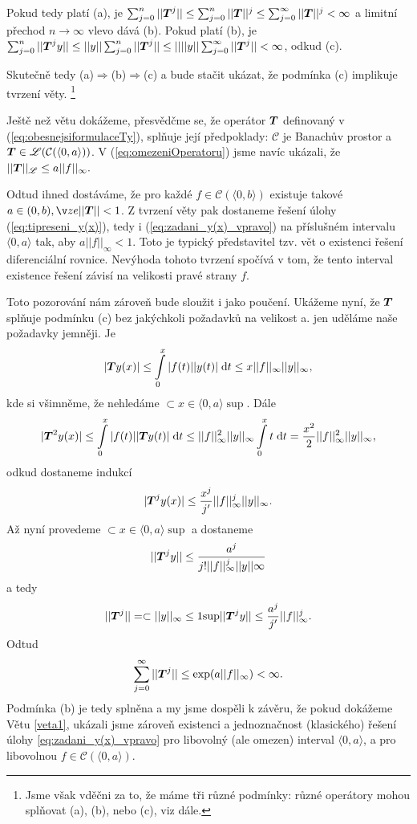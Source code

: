 Pokud tedy platí (a), je $\sum_{j=0}^n|| \boldsymbol{T} ^j||\leq\sum_{j=0}^n|| \boldsymbol{T} ||^j\leq \sum_{j=0}^\infty|| \boldsymbol{T} ||^j<\infty$ a limitní přechod $n\rightarrow \infty$ vlevo dává (b). Pokud platí (b), je $\sum_{j=0}^n|| \boldsymbol{T} ^jy||\leq||y||\sum_{j=0}^n|| \boldsymbol{T} ^j||\leq||||y||\sum_{j=0}^\infty|| \boldsymbol{T} ^j||<\infty$, odkud (c).

Skutečně tedy (a)$\Rightarrow$(b)$\Rightarrow$(c) a bude stačit ukázat, že podmínka (c) implikuje tvrzení věty. \footnote{Jsme však vděčni za to, že máme tři různé podmínky: různé operátory mohou splňovat (a), (b), nebo (c), viz dále.}
\item Ještě než větu dokážeme, přesvědčme se, že operátor $ \boldsymbol{T} $ definovaný v (\ref{eq:obesnejsiformulaceTy}), splňuje její předpoklady: $\mathcal{C}$ je Banachův prostor a $ \boldsymbol{T} \in\mathscr{L}(\mathcal{C}(\langle0,a\rangle))$. V (\ref{eq:omezeniOperatoru}) jsme navíc ukázali, že $|| \boldsymbol{T} ||_{\mathscr{L}}\leq a||f||_\infty.$

Odtud ihned dostáváme, že pro každé $f\in\mathcal{C}(\langle0,b\rangle)$ existuje takové $a\in(0,b), že || \map T ||<1$. Z tvrzení věty pak dostaneme  řešení úlohy (\ref{eq:tipreseni_y(x)}), tedy i (\ref{eq:zadani_y(x)_vpravo}) na příslušném  intervalu $\langle0,a\rangle$ tak, aby $a||f||_\infty<1$. Toto je typický představitel tzv. vět o  existenci řešení diferenciální rovnice. Nevýhoda tohoto tvrzení spočívá v tom, že tento interval existence řešení závisí na velikosti pravé strany $f$.

Toto pozorování nám zároveň bude sloužit i jako poučení. Ukážeme nyní, že $ \boldsymbol{T} $ splňuje podmínku (c) bez jakýchkoli požadavků na velikost a. jen uděláme naše požadavky jemněji. Je 
$$| \boldsymbol{T} y(x)|\leq \int\limits_0^x|f(t)||y(t)|\;\mathrm{d}t\leq x||f||_\infty||y||_\infty,$$
kde si všimněme, že nehledáme $\subset{x\in\langle0,a\rangle}{\sup}$. Dále
$$| \boldsymbol{T} ^2y(x)|\leq\int\limits_0^x|f(t)|| \boldsymbol{T} y(t)|\;\mathrm{d}t\leq ||f||^2_\infty||y||_\infty\int\limits_0^xt\;\mathrm{d}t = \frac{x^2}{2}||f||^2_\infty||y||_\infty,$$
odkud dostaneme indukcí
$$| \boldsymbol{T} ^jy(x)|\leq\frac{x^j}{j'}||f||^j_\infty||y||_\infty.$$
Až nyní provedeme $\subset{x\in\langle0,a\rangle}{\sup}$ a dostaneme 
$$|| \boldsymbol{T} ^jy||\leq\frac{a^j}{j!||f||^j_\infty||y||\infty}$$ a tedy 
$$|| \boldsymbol{T} ^j||=\subset{||y||_\infty\leq 1}{\sup}|| \boldsymbol{T} ^jy||\leq\frac{a^j}{j'}||f||^j_\infty.$$
Odtud $$\sum\limits_{j=0}^\infty|| \boldsymbol{T} ^j||\leq\exp(a||f||_\infty)<\infty.$$
Podmínka (b) je tedy splněna a my jsme dospěli k závěru, že pokud dokážeme Větu \ref{veta1}, ukázali jsme zároveň existenci a jednoznačnost (klasického) řešení úlohy \ref{eq:zadani_y(x)_vpravo} pro libovolný (ale omezen) interval $\langle0,a\rangle$, a pro libovolnou $f\in\mathcal{C}(\langle0,a\rangle)$.

